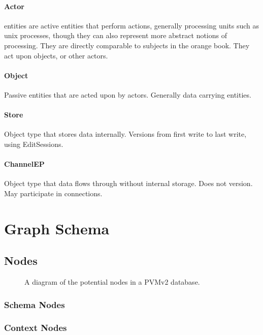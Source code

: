 \documentclass[12pt,twoside,a4paper]{article}
\begin{document}
\paragraph{Actor}
\label{sec:ty:actor}
 entities are active entities that perform actions, generally processing units such as unix processes, though they can also represent more abstract notions of processing. They are directly comparable to subjects in the orange book. They act upon objects, or other actors.

\paragraph{Object}
Passive entities that are acted upon by actors. Generally data carrying entities.

\paragraph{Store}
Object type that stores data internally. Versions from first write to last write, using EditSessions.

\paragraph{ChannelEP}
Object type that data flows through without internal storage. Does not version. May participate in connections.

\section{Graph Schema}

\subsection{Nodes}

\begin{figure}[h]
\centering

\caption{A diagram of the potential nodes in a PVMv2 database.}
\end{figure}

\subsubsection{Schema Nodes}

\subsubsection{Context Nodes}
\end{document}
